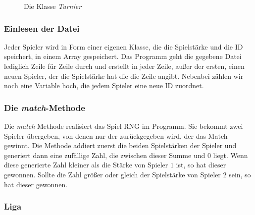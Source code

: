 \documentclass[a4paper, 12pt]{scrartcl}
\begin{document}
    \begin{figure}[H]
    \centering
    \caption{Die Klasse \emph{Turnier}}
\end{figure}
\subsubsection{Einlesen der Datei}

Jeder Spieler wird in Form einer eigenen Klasse, die die Spielstärke und die ID speichert, in einem Array gespeichert. Das Programm geht die gegebene Datei lediglich Zeile für Zeile durch und erstellt in jeder Zeile, außer der ersten, einen neuen Spieler, der die Spielstärke hat die die Zeile angibt. Nebenbei zählen wir noch eine Variable hoch, die jedem Spieler eine neue ID zuordnet.

\subsubsection{Die \emph{match}-Methode}

Die \emph{match} Methode realisiert das Spiel RNG im Programm. Sie bekommt zwei Spieler übergeben, von denen nur der
zurückgegeben wird, der das Match gewinnt. Die Methode addiert zuerst die
beiden Spielstärken der Spieler und generiert dann eine zufällige Zahl, die
zwischen dieser Summe und $0$ liegt. Wenn diese generierte Zahl kleiner als die
Stärke von Spieler $1$ ist, so hat dieser gewonnen. Sollte die Zahl größer oder
gleich der Spielstärke von Spieler $2$ sein, so hat dieser gewonnen.

\subsubsection{Liga}
\end{document}

